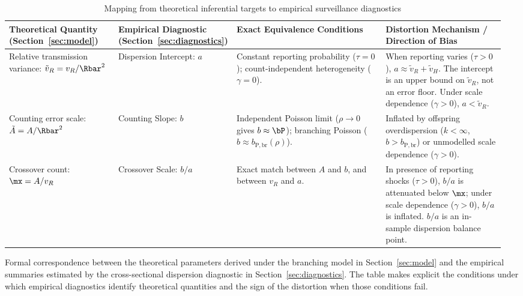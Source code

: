 \begin{table}[!tbp]
\centering
\small
\caption{Mapping from theoretical inferential targets to empirical surveillance diagnostics}
\label{tab:rosetta}
\begin{tabularx}{\linewidth}{@{}p{0.22\linewidth}p{0.20\linewidth}p{0.30\linewidth}p{0.24\linewidth}@{}}
\toprule
Theoretical Quantity (Section~\ref{sec:model}) & Empirical Diagnostic (Section~\ref{sec:diagnostics}) & Exact Equivalence Conditions & Distortion Mechanism / Direction of Bias \\
\midrule
Relative transmission variance: $\tilde v_R = v_R / \Rbar^2$ & Dispersion Intercept: $a$ & Constant reporting probability ($\tau = 0$); count-independent heterogeneity ($\gamma = 0$). & When reporting varies ($\tau > 0$), $a \approx \tilde v_R + \tilde v_H$. The intercept is an upper bound on $\tilde v_R$, not an error floor. Under scale dependence ($\gamma > 0$), $a < \tilde v_R$. \\
\addlinespace[3pt]
Counting error scale: $\tilde A = A / \Rbar^2$ & Counting Slope: $b$ & Independent Poisson limit ($\rho \to 0$ gives $b \approx \bP$); branching Poisson ($b \approx b_{\mathrm{P,br}}(\rho)$). & Inflated by offspring overdispersion ($k < \infty$, $b > b_{\mathrm{P,br}}$) or unmodelled scale dependence ($\gamma > 0$). \\
\addlinespace[3pt]
Crossover count: $\mx = A / v_R$ & Crossover Scale: $b/a$ & Exact match between $A$ and $b$, and between $v_R$ and $a$. & In presence of reporting shocks ($\tau > 0$), $b/a$ is attenuated below $\mx$; under scale dependence ($\gamma > 0$), $b/a$ is inflated. $b/a$ is an in-sample dispersion balance point. \\
\bottomrule
\end{tabularx}
\par\smallskip
\begin{minipage}{\linewidth}\footnotesize\raggedright Formal correspondence between the theoretical parameters derived under the branching model in Section~\ref{sec:model} and the empirical summaries estimated by the cross-sectional dispersion diagnostic in Section~\ref{sec:diagnostics}. The table makes explicit the conditions under which empirical diagnostics identify theoretical quantities and the sign of the distortion when those conditions fail.\end{minipage}
\end{table}
